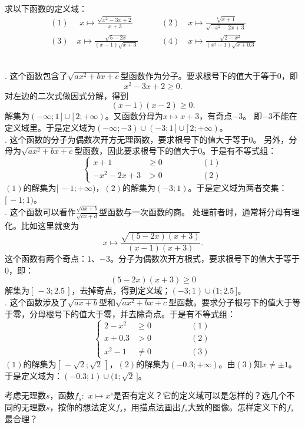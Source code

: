 \documentclass[12pt,UTF8]{ctexbook}
\begin{document}
\begin{et}
    求以下函数的定义域：\\
    \begin{align*}
        (1) \,\,\quad x\mapsto \frac{\sqrt{x^2 - 3x + 2}}{x + 3} \quad & \quad (2) \quad x\mapsto \frac{\sqrt[4]{x + 1}}{\sqrt{- x^2 - 2x + 3}} \\
        (3) \quad x\mapsto \frac{\sqrt{5 - 2x}}{(x - 1)\sqrt{x + 3}} \quad & \quad (4)\quad x\mapsto \frac{\sqrt{2 - x^2}}{(x^2 - 1)\sqrt{x + 0.3}}  
    \end{align*}
\end{et}
\begin{so}
    \mbox{}\\
    . 这个函数包含了$\sqrt{ax^2 + bx + c}$型函数作为分子。要求根号下的值大于等于$0$，即
    $$ x^2 - 3x + 2 \geqslant 0.$$
    对左边的二次式做因式分解，得到
    $$ (x - 1)(x - 2) \geqslant 0.$$
    解集为$(-\infty; 1\,]\cup[\,2; +\infty)$。又函数分母为$x\mapsto x + 3$，有奇点$-3$。
    即$-3$不能在定义域里。于是定义域为$(-\infty; -3)\cup(-3; 1\,]\cup[\,2;  +\infty)$。\\
    . 这个函数的分子为偶数次开方无理函数，要求根号下的值大于等于$0$。
    另外，分母为$\sqrt{ax^2 + bx + c}$型函数，因此要求根号下的值大于$0$。于是有不等式组：
    $$\left\{\begin{array}{ccr}
        x + 1 &\geqslant 0 & \quad\quad\quad\quad (1) \\
        - x^2 - 2x + 3 &> 0  & \quad\quad\quad\quad (2)
    \end{array}\right.$$
    $(1)$的解集为$[\,-1; +\infty)$，$(2)$的解集为$(-3;  1)$。于是定义域为两者交集：$[\,-1;  1)$。\\
    . 这个函数可以看作$\frac{\sqrt{ax + b}}{\sqrt{cx + d}}$型函数与一次函数的商。
    处理前者时，通常将分母有理化。比如这里就变为
    $$ x \mapsto \frac{\sqrt{(5 - 2x)(x + 3)}}{(x - 1)(x + 3)}. $$
    这个函数有两个奇点：$1$、$-3$。分子为偶数次开方根式，要求根号下的值大于等于$0$，即：
    $$ (5 - 2x)(x + 3) \geqslant 0$$
    解集为$[\,-3; 2.5\,]$，去掉奇点，得到定义域；$(-3; 1)\cup(1; 2.5\,]$。\\
    . 这个函数涉及了$\sqrt{ax + b}$型和$\sqrt{ax^2 + bx + c}$型函数。要求分子根号下的值大于等于零，分母根号下的值大于零，并去除奇点。于是有不等式组：
    $$\left\{\begin{array}{ccr}
        2 - x^2 &\geqslant 0 & \quad\quad\quad\quad (1) \\
        x + 0.3 &> 0  & \quad\quad\quad\quad (2) \\
        x^2 - 1 &\neq 0 & \quad\quad\quad\quad (3) 
    \end{array}\right.$$
    $(1)$的解集为$[\,-\sqrt{2};\sqrt{2}\,]$，$(2)$的解集为$(-0.3; +\infty)$。由$(3)$知$x\neq \pm 1$。
    于是定义域为：$(-0.3; 1)\cup(1; \sqrt{2}\,]$。
\end{so}
\begin{sk}
    考虑无理数$s$，函数$f_s: \,\, x\mapsto x^s$是否有定义？它的定义域可以是怎样的？选几个不同的无理数$s$，按你的想法定义$f_s$，用描点法画出$f_s$大致的图像。怎样定义下的$f_s$最合理？
\end{sk}
\end{document}
